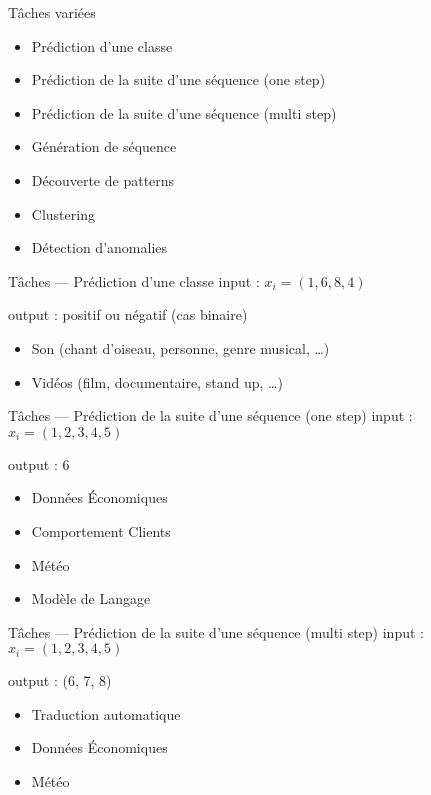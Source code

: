 \begin{frame}{Tâches variées}
  \begin{itemize}[<+->]
    \item Prédiction d'une classe
    \item Prédiction de la suite d'une séquence (one step)
    \item Prédiction de la suite d'une séquence (multi step)
    \item Génération de séquence
    \item Découverte de patterns
    \item Clustering
    \item Détection d'anomalies
  \end{itemize}
\end{frame}

\begin{frame}{Tâches --- Prédiction d'une classe}
  input : $x_i=(1,6,8,4)$

  output : positif ou négatif (cas binaire)

  \begin{itemize}
    \item Son (chant d'oiseau, personne, genre musical, …)
    \item Vidéos (film, documentaire, stand up, …)
  \end{itemize}
\end{frame}

\begin{frame}{Tâches --- Prédiction de la suite d'une séquence (one step)}
  input : $x_i=(1,2,3,4,5)$

  output : 6

  \begin{itemize}
    \item Données Économiques
    \item Comportement Clients
    \item Météo
    \item Modèle de Langage
  \end{itemize}
\end{frame}

\begin{frame}{Tâches --- Prédiction de la suite d'une séquence (multi step)}
  input : $x_i=(1,2,3,4,5)$

  output : (6, 7, 8)

  \begin{itemize}
    \item Traduction automatique
    \item Données Économiques
    \item Météo
  \end{itemize}
\end{frame}

